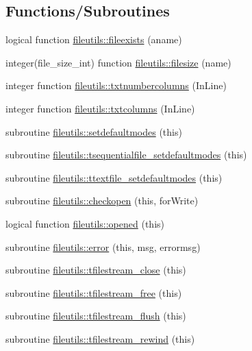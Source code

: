 \subsection*{Functions/\+Subroutines}
\begin{DoxyCompactItemize}
\item 
logical function \mbox{\hyperlink{namespacefileutils_a7eed5e57dbe4803901c5cb2d33f32e66}{fileutils\+::fileexists}} (aname)
\item 
integer(file\+\_\+size\+\_\+int) function \mbox{\hyperlink{namespacefileutils_a7e3025ea32fc9f426d78cd5dab68e470}{fileutils\+::filesize}} (name)
\item 
integer function \mbox{\hyperlink{namespacefileutils_a16fc3d0615e1fa05eed9d70c7f6c8861}{fileutils\+::txtnumbercolumns}} (In\+Line)
\item 
integer function \mbox{\hyperlink{namespacefileutils_a704f148cd0ca7af88eec65d167460683}{fileutils\+::txtcolumns}} (In\+Line)
\item 
subroutine \mbox{\hyperlink{namespacefileutils_ab29c958b3ef2154cee501206eeeab071}{fileutils\+::setdefaultmodes}} (this)
\item 
subroutine \mbox{\hyperlink{namespacefileutils_aae5dfea33ac7521267fc2bd055c532e7}{fileutils\+::tsequentialfile\+\_\+setdefaultmodes}} (this)
\item 
subroutine \mbox{\hyperlink{namespacefileutils_a40d911d4c6f3119ad169ba092b5d8131}{fileutils\+::ttextfile\+\_\+setdefaultmodes}} (this)
\item 
subroutine \mbox{\hyperlink{namespacefileutils_af19fea352f8dfa2014baece1a62940f4}{fileutils\+::checkopen}} (this, for\+Write)
\item 
logical function \mbox{\hyperlink{namespacefileutils_ab874a71428e21012e34c256de9cf461d}{fileutils\+::opened}} (this)
\item 
subroutine \mbox{\hyperlink{namespacefileutils_ad8e0926f0aaad2fd9464ad5e4bc01db0}{fileutils\+::error}} (this, msg, errormsg)
\item 
subroutine \mbox{\hyperlink{namespacefileutils_a92f8878926ad7488d2cdaf82a8d09d6a}{fileutils\+::tfilestream\+\_\+close}} (this)
\item 
subroutine \mbox{\hyperlink{namespacefileutils_a5c9784aa40b01ea30ef204e7aeb9db9e}{fileutils\+::tfilestream\+\_\+free}} (this)
\item 
subroutine \mbox{\hyperlink{namespacefileutils_aed117908fc58fe14559073780dce043b}{fileutils\+::tfilestream\+\_\+flush}} (this)
\item 
subroutine \mbox{\hyperlink{namespacefileutils_a0c1819d96b0ed98d4ae2ebd441d5810f}{fileutils\+::tfilestream\+\_\+rewind}} (this)

\end{DoxyCompactItemize}
